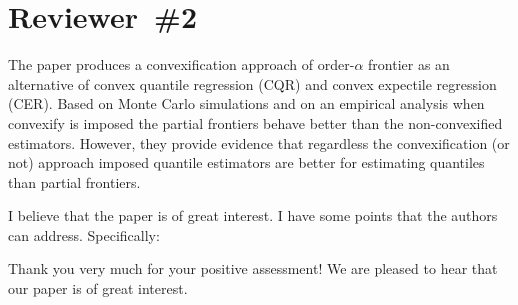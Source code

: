 \documentclass[12pt]{article}
\newcommand{\np}{\vskip 0.3cm}
\begin{document}

\newpage
\section*{Reviewer~\#2}

\begin{sf}
{\blueb The paper produces a convexification approach of order-$\alpha$ frontier as an alternative of convex quantile regression (CQR) and convex expectile regression (CER). Based on Monte Carlo simulations and on an empirical analysis when convexify is imposed the partial frontiers behave better than the non-convexified estimators. However, they provide evidence that regardless the convexification (or not) approach imposed quantile estimators are better for estimating quantiles than partial frontiers.\np

I believe that the paper is of great interest. I have some points that the authors can address. Specifically:} \np
\end{sf}
\begin{response}
Thank you very much for your positive assessment! We are pleased to hear that our paper is of great interest. 
\end{response}

\end{document}
